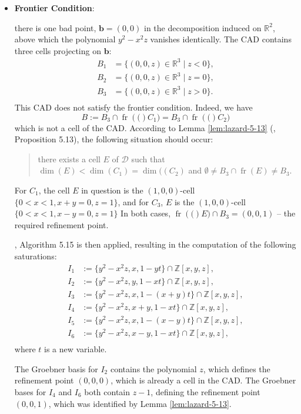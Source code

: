 \documentclass[
]{book}
\theoremstyle{definition}
\theoremstyle{definition}
\theoremstyle{definition}
\theoremstyle{definition}
\theoremstyle{remark}
\begin{document}
\begin{itemize}
\item
  \textbf{Frontier Condition}:

  there is one bad point, \(\mathbf{b} = (0,0)\) in the decomposition induced on \(\mathbb{R}^2\), above which the polynomial \(y^2 - x^2 z\) vanishes identically.
  The CAD contains three cells projecting on \(\mathbf{b}\):
  \begin{align}
  B_1 &= \{ (0,0,z) \in \mathbb{R}^3 \mid z < 0 \},\\
  B_2 &= \{ (0,0,z) \in \mathbb{R}^3 \mid z = 0 \},\\
  B_3 &= \{ (0,0,z) \in \mathbb{R}^3 \mid z > 0 \}.\\
  \end{align}
  This CAD does not satisfy the frontier condition.
  Indeed, we have
  \[
  B := B_3 \cap {\operatorname{fr} \left( ( \right)}C_1) = B_3 \cap {\operatorname{fr} \left( ( \right)}C_2)
  \] which is not a cell of the CAD.
  According to Lemma \ref{lem:lazard-5-13} (\citet{lazard10}, Proposition 5.13), the following situation should occur:

  \begin{quote}
  there exists a cell \(E\) of \(\mathcal{D}\) such that \(\dim(E) < \dim(C_1) = \dim((C_2)\) and \(\emptyset \neq B_3 \cap {\operatorname{fr} \left(  E  \right)} \neq B_3\).
  \end{quote}

  For \(C_1\), the cell \(E\) in question is the \((1,0,0)\)-cell \(\{ 0 < x < 1, x + y = 0, z = 1 \}\),
  and for \(C_3\), \(E\) is the \((1,0,0)\)-cell \(\{ 0 < x < 1, x - y = 0, z = 1 \}\)
  In both cases, \({\operatorname{fr} \left( ( \right)}E) \cap B_3 = (0,0,1)\) -- the required refinement point.

  \citet{lazard10}, Algorithm 5.15 is then applied, resulting in the computation of the following saturations:
  \begin{align}
  I_1 &:= \{ y^2 - x^2 z, x, 1 - y t \} \cap \mathbb{Z}[x,y,z], \\
  I_2 &:= \{ y^2 - x^2 z, y, 1 - x t \} \cap \mathbb{Z}[x,y,z], \\
  I_3 &:= \{ y^2 - x^2 z, x, 1 - (x + y) t \} \cap \mathbb{Z}[x,y,z], \\
  I_4 &:= \{ y^2 - x^2 z, x + y, 1 - x t \} \cap \mathbb{Z}[x,y,z], \\
  I_5 &:= \{ y^2 - x^2 z, x, 1 - (x - y) t \} \cap \mathbb{Z}[x,y,z], \\
  I_6 &:= \{ y^2 - x^2 z, x - y, 1 - x t \} \cap \mathbb{Z}[x,y,z], \\
  \end{align}
  where \(t\) is a new variable.

  The Groebner basis for \(I_2\) contains the polynomial \(z\), which defines the refinement point \((0,0,0)\), which is already a cell in the CAD.
  The Groebner bases for \(I_4\) and \(I_6\) both contain \(z-1\), defining the refinement point \((0,0,1)\), which was identified by Lemma \ref{lem:lazard-5-13}.
\end{itemize}
\end{document}
